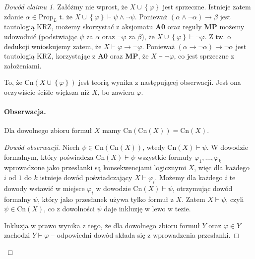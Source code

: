 \begin{proof}[Dowód claimu 1]
Załóżmy nie wprost, że \( X \cup \left\{ \varphi \right\} \) jest sprzeczne. Istnieje zatem zdanie \( \alpha \in \mathrm{Prop}_L \) t. że \( X \cup \left\{ \varphi \right\} \vdash \psi \wedge \neg \psi \). Ponieważ \( (\alpha \wedge \neg \alpha) \to \beta \) jest tautologią KRZ, możemy skorzystać z aksjomatu \textbf{A0} oraz reguły \textbf{MP} możemy udowodnić (podstwiając \( \psi \) za \( \alpha \) oraz \( \neg\varphi \) za \( \beta \)), że \( X \cup \left\{ \varphi \right\} \vdash \neg\varphi\). Z tw. o dedukcji wnioskujemy zatem, że \( X \vdash \varphi \to \neg\varphi \). Ponieważ \( (\alpha \to \neg\alpha) \to \neg\alpha \) jest tautologią KRZ, korzystając z \textbf{A0} oraz \textbf{MP}, że \( X \vdash \neg\varphi \), co jest sprzeczne z założeniami. 

To, że \( \mathrm{Cn}(X \cup \left\{ \varphi \right\}) \) jest teorią wynika z następującej obserwacji. Jest ona oczywiście ściśle większa niż \( X \), bo zawiera \( \varphi \).

\paragraph{Obserwacja.} Dla dowolnego zbioru formuł \( X \) mamy \( \mathrm{Cn}( \mathrm{Cn}(X) ) = \mathrm{Cn}(X) \).

\begin{proof}[Dowód obserwacji]

    Niech \( \psi \in  \mathrm{Cn}( \mathrm{Cn}(X) ) \), wtedy \( \mathrm{Cn}(X) \vdash \psi \). W dowodzie formalnym, który poświadcza \( \mathrm{Cn}(X) \vdash \psi \) wszystkie formuły \( \varphi_1, \ldots, \varphi_k \) wprowadzone jako przesłanki są konsekwencjami logicznymi \( X \), więc dla każdego \( i  \) od \( 1 \) do \( k \) istnieje dowód poświadczający \( X \vdash \varphi_i \). Możemy dla każdego \( i \) te dowody wstawić w miejsce \( \varphi_i \) w dowodzie \( \mathrm{Cn}(X) \vdash \psi \), otrzymując dowód formalny \( \psi \), który jako przesłanek używa tylko formuł z \( X \). Zatem \( X \vdash \psi \), czyli \( \psi \in \mathrm{Cn}(X) \), co z dowolności \( \psi \) daje inkluzję w lewo w tezie. 

    Inkluzja w prawo wynika z tego, że dla dowolnego zbioru formuł \( Y \) oraz \( \varphi \in Y \) zachodzi \( Y \vdash \varphi \) -- odpowiedni dowód składa się z wprowadzenia przesłanki.
    
\end{proof}


\end{proof}


